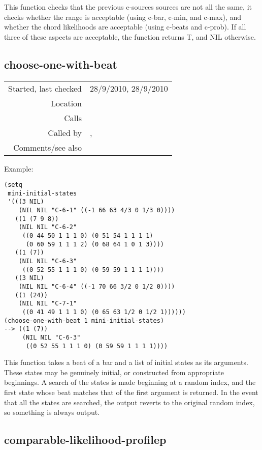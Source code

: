 \noindent This function checks that the previous
c-sources sources are not all the same, it checks
whether the range is acceptable (using c-bar, c-min,
and c-max), and whether the chord likelihoods are
acceptable (using c-beats and c-prob). If all three of
these aspects are acceptable, the function returns T,
and NIL otherwise.


\subsection*{choose-one-with-beat}\label{fun:choose-one-with-beat}

\vspace{0.3cm}
\begin{tabular}{r|p{8cm}}
Started, last checked & 28/9/2010, 28/9/2010 \\
Location & \nameref{sec:generating-beat-MNN-spacing-forwards} \\
Calls & \\
Called by & \nameref{fun:generate-beat-MNN-spacing->},\newline \nameref{fun:generate-beat-spacing-forcing->} \\
Comments/see also &
\end{tabular}

\vspace{0.5cm}
\noindent Example:
\begin{verbatim}
(setq
 mini-initial-states
 '(((3 NIL)
    (NIL NIL "C-6-1" ((-1 66 63 4/3 0 1/3 0))))
   ((1 (7 9 8))
    (NIL NIL "C-6-2"
     ((0 44 50 1 1 1 0) (0 51 54 1 1 1 1)
      (0 60 59 1 1 1 2) (0 68 64 1 0 1 3))))
   ((1 (7))
    (NIL NIL "C-6-3"
     ((0 52 55 1 1 1 0) (0 59 59 1 1 1 1))))
   ((3 NIL)
    (NIL NIL "C-6-4" ((-1 70 66 3/2 0 1/2 0))))
   ((1 (24))
    (NIL NIL "C-7-1"
     ((0 41 49 1 1 1 0) (0 65 63 1/2 0 1/2 1))))))
(choose-one-with-beat 1 mini-initial-states)
--> ((1 (7))
     (NIL NIL "C-6-3"
      ((0 52 55 1 1 1 0) (0 59 59 1 1 1 1))))
\end{verbatim}

\noindent This function takes a beat of a bar and a
list of initial states as its arguments. These states
may be genuinely initial, or constructed from
appropriate beginnings. A search of the states is
made beginning at a random index, and the first state
whose beat matches that of the first argument is
returned. In the event that all the states are
searched, the output reverts to the original random
index, so something is always output.


\subsection*{comparable-likelihood-profilep}\label{fun:comparable-likelihood-profilep}

